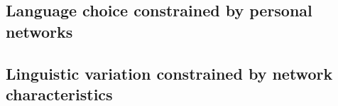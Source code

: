     \subsection{Language choice constrained by personal networks}
    \subsection{Linguistic variation constrained by network characteristics}
